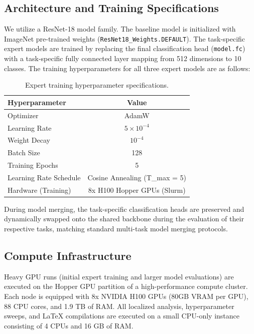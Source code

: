 \documentclass{article}
\theoremstyle{plain}
\theoremstyle{definition}
\theoremstyle{remark}
\begin{document}
\subsection{Architecture and Training Specifications}
We utilize a ResNet-18 model family. The baseline model is initialized with ImageNet pre-trained weights (\texttt{ResNet18\_Weights.DEFAULT}). The task-specific expert models are trained by replacing the final classification head (\texttt{model.fc}) with a task-specific fully connected layer mapping from 512 dimensions to 10 classes.
The training hyperparameters for all three expert models are as follows:
\begin{table}[ht]
\caption{Expert training hyperparameter specifications.}
\label{tab:hyperparameters}
\vskip 0.15in
\begin{center}
\begin{small}
\begin{sc}
\begin{tabular}{lc}
\toprule
Hyperparameter & Value \\
\midrule
Optimizer & AdamW \\
Learning Rate & $5 \times 10^{-4}$ \\
Weight Decay & $10^{-4}$ \\
Batch Size & 128 \\
Training Epochs & 5 \\
Learning Rate Schedule & Cosine Annealing (T\_max = 5) \\
Hardware (Training) & 8x H100 Hopper GPUs (Slurm) \\
\bottomrule
\end{tabular}
\end{sc}
\end{small}
\end{center}
\vskip -0.1in
\end{table}

During model merging, the task-specific classification heads are preserved and dynamically swapped onto the shared backbone during the evaluation of their respective tasks, matching standard multi-task model merging protocols.

\subsection{Compute Infrastructure}
Heavy GPU runs (initial expert training and larger model evaluations) are executed on the Hopper GPU partition of a high-performance compute cluster. Each node is equipped with 8x NVIDIA H100 GPUs (80GB VRAM per GPU), 88 CPU cores, and 1.9 TB of RAM. All localized analysis, hyperparameter sweeps, and LaTeX compilations are executed on a small CPU-only instance consisting of 4 CPUs and 16 GB of RAM.
\end{document}
